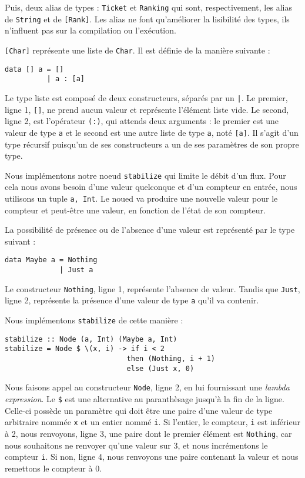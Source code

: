 \documentclass{llncs}
\begin{document}
Puis, deux alias de types : \lstinline{Ticket} et \lstinline{Ranking} qui sont,
respectivement, les alias de \lstinline{String} et de \lstinline{[Rank]}.
Les alias ne font qu'améliorer la lisibilité des types, ils n'influent pas sur
la compilation ou l'exécution.

\lstinline{[Char]} représente une liste de \lstinline{Char}.
Il est définie de la manière suivante :
\begin{lstlisting}
data [] a = []
          | a : [a]
\end{lstlisting}

Le type liste est composé de deux constructeurs, séparés par un \lstinline{|}.
Le premier, ligne 1, \lstinline{[]}, ne prend aucun valeur et représente l'élément
liste vide.
Le second, ligne 2, est l'opérateur \lstinline{(:)}, qui attends deux arguments :
le premier est une valeur de type \lstinline{a} et le second est une autre liste de
type \lstinline{a}, noté \lstinline{[a]}.
Il s'agit d'un type récursif puisqu'un de ses constructeurs a un de ses paramètres
de son propre type.

Nous implémentons notre noeud \lstinline{stabilize} qui limite le débit d'un flux.
Pour cela nous avons besoin d'une valeur quelconque et d'un compteur en entrée,
nous utilisons un tuple \lstinline{a, Int}.
Le noued va produire une nouvelle valeur pour le compteur et peut-être une valeur,
en fonction de l'état de son compteur.

La possibilité de présence ou de l'absence d'une valeur est représenté par le type
suivant :

\begin{lstlisting}
data Maybe a = Nothing
             | Just a
\end{lstlisting}

Le constructeur \lstinline{Nothing}, ligne 1, représente l'absence de valeur.
Tandis que \lstinline{Just}, ligne 2, représente la présence d'une valeur de type
\lstinline{a} qu'il va contenir.

Nous implémentons \lstinline{stabilize} de cette manière :
\begin{lstlisting}
stabilize :: Node (a, Int) (Maybe a, Int)
stabilize = Node $ \(x, i) -> if i < 2
                             then (Nothing, i + 1)
                             else (Just x, 0)
\end{lstlisting}

Nous faisons appel au constructeur \lstinline{Node}, ligne 2, en lui fournissant
une \emph{lambda expression}.
Le \lstinline{$} est une alternative au paranthèsage jusqu'à la fin de la ligne.
Celle-ci possède un paramètre qui doit être une paire d'une valeur de type arbitraire
nommée \lstinline{x} et un entier nommé \lstinline{i}.
Si l'entier, le compteur, \lstinline{i} est inférieur à 2, nous renvoyons, ligne 3,
une paire dont le premier élément est \lstinline{Nothing}, car nous souhaitons
ne renvoyer qu'une valeur sur 3, et nous incrémentons le compteur \lstinline{i}.
Si non, ligne 4, nous renvoyons une paire contenant la valeur et nous remettons
le compteur à 0.
\end{document}

